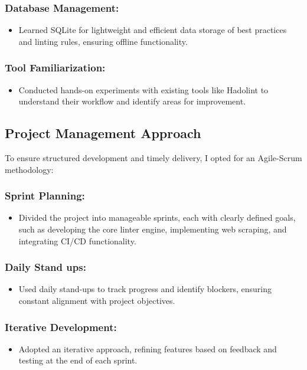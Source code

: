 \subsubsection{Database Management:}
\begin{itemize}
    \item Learned SQLite for lightweight and efficient data storage of best practices and linting rules, ensuring offline functionality.
\end{itemize}

\subsubsection{Tool Familiarization:}
\begin{itemize}
    \item Conducted hands-on experiments with existing tools like Hadolint to understand their workflow and identify areas for improvement.
\end{itemize}

\subsection{Project Management Approach}
To ensure structured development and timely delivery, I opted for an Agile-Scrum methodology:

\subsubsection{Sprint Planning:}
\begin{itemize}
    \item Divided the project into manageable sprints, each with clearly defined goals, such as developing the core linter engine, implementing web scraping, and integrating CI/CD functionality.
\end{itemize}

\subsubsection{Daily Stand ups:}
\begin{itemize}
    \item Used daily stand-ups to track progress and identify blockers, ensuring constant alignment with project objectives.
\end{itemize}

\subsubsection{Iterative Development:}
\begin{itemize}
    \item Adopted an iterative approach, refining features based on feedback and testing at the end of each sprint.
\end{itemize}
